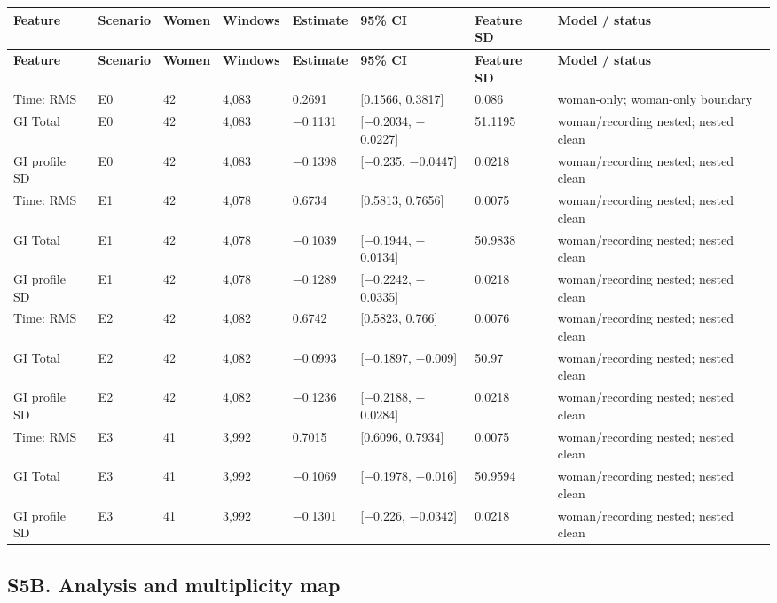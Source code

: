 \documentclass[10pt]{article}
\begin{document}
\begin{longtable}{p{3.3cm}p{1.5cm}p{1.2cm}p{1.4cm}p{1.5cm}p{3.0cm}p{1.5cm}p{4.0cm}}
\toprule
\textbf{Feature} & \textbf{Scenario} & \textbf{Women} & \textbf{Windows} & \textbf{Estimate} & \textbf{95\% CI} & \textbf{Feature SD} & \textbf{Model / status} \\
\midrule
\endfirsthead
\toprule
\textbf{Feature} & \textbf{Scenario} & \textbf{Women} & \textbf{Windows} & \textbf{Estimate} & \textbf{95\% CI} & \textbf{Feature SD} & \textbf{Model / status} \\
\midrule
\endhead
Time: RMS & E0 & 42 & 4,083 & 0.2691 & [0.1566, 0.3817] & 0.086 & woman-only; woman-only boundary \\
GI Total & E0 & 42 & 4,083 & $-$0.1131 & [$-$0.2034, $-$0.0227] & 51.1195 & woman/recording nested; nested clean \\
GI profile SD & E0 & 42 & 4,083 & $-$0.1398 & [$-$0.235, $-$0.0447] & 0.0218 & woman/recording nested; nested clean \\
Time: RMS & E1 & 42 & 4,078 & 0.6734 & [0.5813, 0.7656] & 0.0075 & woman/recording nested; nested clean \\
GI Total & E1 & 42 & 4,078 & $-$0.1039 & [$-$0.1944, $-$0.0134] & 50.9838 & woman/recording nested; nested clean \\
GI profile SD & E1 & 42 & 4,078 & $-$0.1289 & [$-$0.2242, $-$0.0335] & 0.0218 & woman/recording nested; nested clean \\
Time: RMS & E2 & 42 & 4,082 & 0.6742 & [0.5823, 0.766] & 0.0076 & woman/recording nested; nested clean \\
GI Total & E2 & 42 & 4,082 & $-$0.0993 & [$-$0.1897, $-$0.009] & 50.97 & woman/recording nested; nested clean \\
GI profile SD & E2 & 42 & 4,082 & $-$0.1236 & [$-$0.2188, $-$0.0284] & 0.0218 & woman/recording nested; nested clean \\
Time: RMS & E3 & 41 & 3,992 & 0.7015 & [0.6096, 0.7934] & 0.0075 & woman/recording nested; nested clean \\
GI Total & E3 & 41 & 3,992 & $-$0.1069 & [$-$0.1978, $-$0.016] & 50.9594 & woman/recording nested; nested clean \\
GI profile SD & E3 & 41 & 3,992 & $-$0.1301 & [$-$0.226, $-$0.0342] & 0.0218 & woman/recording nested; nested clean \\
\bottomrule
\end{longtable}
\subsection*{S5B. Analysis and multiplicity map}
\end{document}
